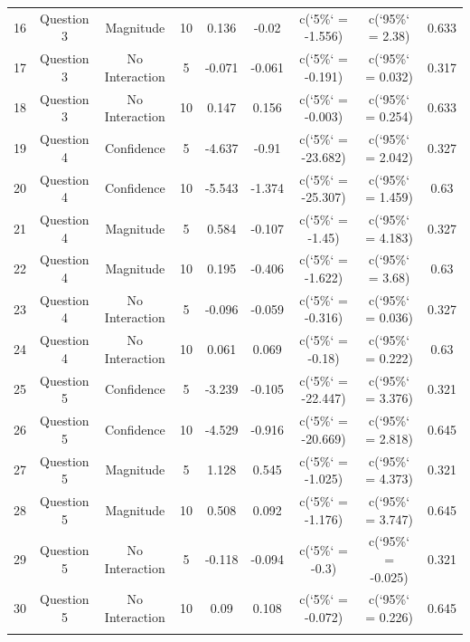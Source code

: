\begin{table}[!htbp]
\begin{tabular}{@{\extracolsep{5pt}} ccccccccc}
16 & Question 3 & Magnitude & 10 & 0.136 & -0.02 & c(`5\%` = -1.556) & c(`95\%` = 2.38) & 0.633 \\ 
17 & Question 3 & No Interaction & 5 & -0.071 & -0.061 & c(`5\%` = -0.191) & c(`95\%` = 0.032) & 0.317 \\ 
18 & Question 3 & No Interaction & 10 & 0.147 & 0.156 & c(`5\%` = -0.003) & c(`95\%` = 0.254) & 0.633 \\ 
19 & Question 4 & Confidence & 5 & -4.637 & -0.91 & c(`5\%` = -23.682) & c(`95\%` = 2.042) & 0.327 \\ 
20 & Question 4 & Confidence & 10 & -5.543 & -1.374 & c(`5\%` = -25.307) & c(`95\%` = 1.459) & 0.63 \\ 
21 & Question 4 & Magnitude & 5 & 0.584 & -0.107 & c(`5\%` = -1.45) & c(`95\%` = 4.183) & 0.327 \\ 
22 & Question 4 & Magnitude & 10 & 0.195 & -0.406 & c(`5\%` = -1.622) & c(`95\%` = 3.68) & 0.63 \\ 
23 & Question 4 & No Interaction & 5 & -0.096 & -0.059 & c(`5\%` = -0.316) & c(`95\%` = 0.036) & 0.327 \\ 
24 & Question 4 & No Interaction & 10 & 0.061 & 0.069 & c(`5\%` = -0.18) & c(`95\%` = 0.222) & 0.63 \\ 
25 & Question 5 & Confidence & 5 & -3.239 & -0.105 & c(`5\%` = -22.447) & c(`95\%` = 3.376) & 0.321 \\ 
26 & Question 5 & Confidence & 10 & -4.529 & -0.916 & c(`5\%` = -20.669) & c(`95\%` = 2.818) & 0.645 \\ 
27 & Question 5 & Magnitude & 5 & 1.128 & 0.545 & c(`5\%` = -1.025) & c(`95\%` = 4.373) & 0.321 \\ 
28 & Question 5 & Magnitude & 10 & 0.508 & 0.092 & c(`5\%` = -1.176) & c(`95\%` = 3.747) & 0.645 \\ 
29 & Question 5 & No Interaction & 5 & -0.118 & -0.094 & c(`5\%` = -0.3) & c(`95\%` = -0.025) & 0.321 \\ 
30 & Question 5 & No Interaction & 10 & 0.09 & 0.108 & c(`5\%` = -0.072) & c(`95\%` = 0.226) & 0.645 \\ 
\hline \\[-1.8ex] 
\end{tabular} 
\end{table} 
